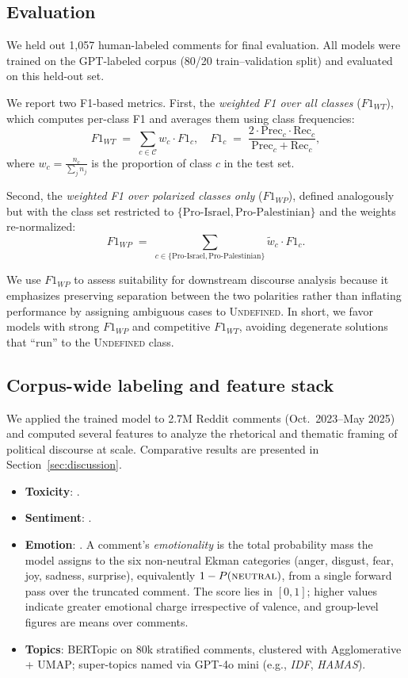 \documentclass[letterpaper]{article} %
\begin{document}
\subsection{Evaluation}
We held out 1{,}057 human-labeled comments for final evaluation. All models were trained on the GPT-labeled corpus (80/20 train–validation split) and evaluated on this held-out set.

We report two F1-based metrics. First, the \emph{weighted F1 over all classes} (\(F1_{WT}\)), which computes per-class F1 and averages them using class frequencies:
\[
F1_{WT} \;=\; \sum_{c \in \mathcal{C}} w_c \cdot F1_c, 
\quad 
F1_c \;=\; \frac{2 \cdot \text{Prec}_c \cdot \text{Rec}_c}{\text{Prec}_c + \text{Rec}_c},
\]
where \(w_c = \tfrac{n_c}{\sum_{j} n_j}\) is the proportion of class \(c\) in the test set.

Second, the \emph{weighted F1 over polarized classes only} (\(F1_{WP}\)), defined analogously but with the class set restricted to \(\{\text{Pro-Israel}, \text{Pro-Palestinian}\}\) and the weights re-normalized:
\[
F1_{WP} \;=\; \sum_{c \in \{\text{Pro-Israel}, \text{Pro-Palestinian}\}} 
\tilde{w}_c \cdot F1_c.
\]

We use \(F1_{WP}\) to assess suitability for downstream discourse analysis because it emphasizes preserving separation between the two polarities rather than inflating performance by assigning ambiguous cases to \textsc{Undefined}. In short, we favor models with strong \(F1_{WP}\) and competitive \(F1_{WT}\), avoiding degenerate solutions that “run” to the \textsc{Undefined} class.

\subsection{Corpus-wide labeling and feature stack}
We applied the trained model to 2.7M Reddit comments (Oct.\ 2023--May 2025) and computed several features to analyze the rhetorical and thematic framing of political discourse at scale. Comparative results are presented in Section~\ref{sec:discussion}.

\begingroup\sloppy
\begin{itemize}
  \item \textbf{Toxicity}:  \cite{toxicbert}.
  \item \textbf{Sentiment}:  \cite{cardiffnlp_sentiment}.
  \item \textbf{Emotion}:  \cite{hartmann_emotion}. A comment's \emph{emotionality} is the total probability mass the model assigns to the six non-neutral Ekman categories (anger, disgust, fear, joy, sadness, surprise), equivalently $1-P(\textsc{neutral})$, from a single forward pass over the truncated comment. The score lies in $[0,1]$; higher values indicate greater emotional charge irrespective of valence, and group-level figures are means over comments.
  \item \textbf{Topics}: BERTopic \cite{grootendorst2022bertopic} on 80k stratified comments, clustered with Agglomerative + UMAP; super-topics named via GPT-4o mini (e.g., \textit{IDF}, \textit{HAMAS}).
\end{itemize}
\endgroup
\end{document}
